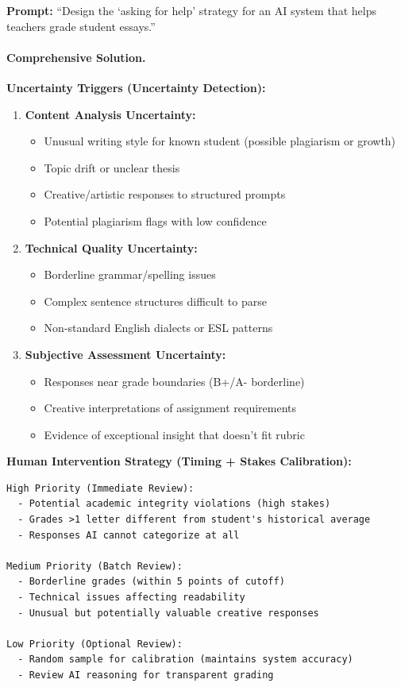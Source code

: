 \textbf{Prompt:} ``Design the `asking for help' strategy for an AI system that helps teachers grade student essays.''

\paragraph{Comprehensive Solution.}

\textbf{Uncertainty Triggers (Uncertainty Detection):}
\begin{enumerate}
    \item \textbf{Content Analysis Uncertainty:}
        \begin{itemize}
            \item Unusual writing style for known student (possible plagiarism or growth)
            \item Topic drift or unclear thesis
            \item Creative/artistic responses to structured prompts
            \item Potential plagiarism flags with low confidence
        \end{itemize}

    \item \textbf{Technical Quality Uncertainty:}
        \begin{itemize}
            \item Borderline grammar/spelling issues
            \item Complex sentence structures difficult to parse
            \item Non-standard English dialects or ESL patterns
        \end{itemize}

    \item \textbf{Subjective Assessment Uncertainty:}
        \begin{itemize}
            \item Responses near grade boundaries (B+/A- borderline)
            \item Creative interpretations of assignment requirements
            \item Evidence of exceptional insight that doesn't fit rubric
        \end{itemize}
\end{enumerate}

\textbf{Human Intervention Strategy (Timing + Stakes Calibration):}
\begin{verbatim}
High Priority (Immediate Review):
  - Potential academic integrity violations (high stakes)
  - Grades >1 letter different from student's historical average
  - Responses AI cannot categorize at all

Medium Priority (Batch Review):
  - Borderline grades (within 5 points of cutoff)
  - Technical issues affecting readability
  - Unusual but potentially valuable creative responses

Low Priority (Optional Review):
  - Random sample for calibration (maintains system accuracy)
  - Review AI reasoning for transparent grading
\end{verbatim}

